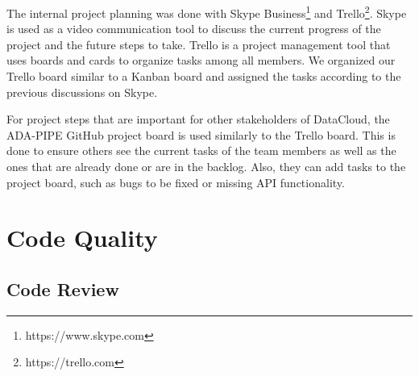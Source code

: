 \documentclass{article}
\begin{document}
        The internal project planning was done with Skype Business\footnote{https://www.skype.com} and Trello\footnote{https://trello.com}.
        Skype is used as a video communication tool to discuss the current progress of the project and the future steps to take.
        Trello is a project management tool that uses boards and cards to organize tasks among all members.
        We organized our Trello board similar to a Kanban board and assigned the tasks according to the previous discussions on Skype.
        
        For project steps that are important for other stakeholders of DataCloud, the ADA-PIPE GitHub project board is used similarly to the Trello board. This is done to ensure others see the current tasks of the team members as well as the ones that are already done or are in the backlog. Also, they can add tasks to the project board, such as bugs to be fixed or missing API functionality.
        
    \section{Code Quality}

        \subsection{Code Review}
\end{document}
